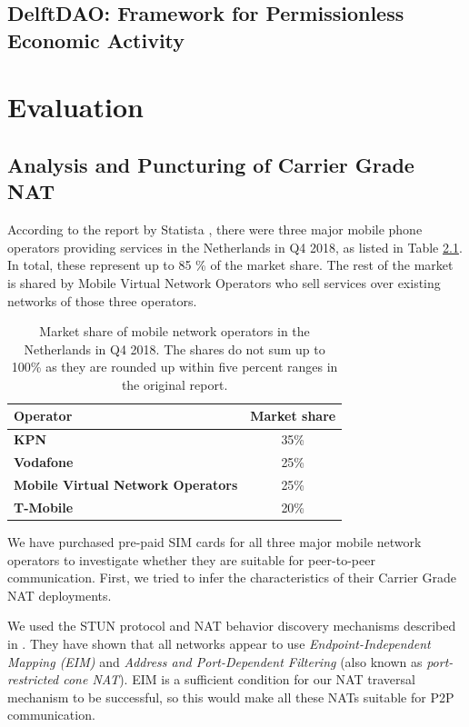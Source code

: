 \section{DelftDAO: Framework for Permissionless Economic Activity}

\chapter{Evaluation}

\section{Analysis and Puncturing of Carrier Grade NAT}

According to the report by Statista \cite{statista:marketshare}, there were three major mobile phone operators providing services in the Netherlands in Q4 2018, as listed in Table \ref{table_marketshare}. In total, these represent up to 85 \% of the market share. The rest of the market is shared by Mobile Virtual Network Operators who sell services over existing networks of those three operators.

\begin{table}
    \centering
    \begin{tabular}{ | l | c | }
        \hline
        \textbf{Operator} & \textbf{Market share} \\
        \hline
        \textbf{KPN} & 35\% \\
        \textbf{Vodafone} & 25\% \\
        \textbf{Mobile Virtual Network Operators} & 25\% \\
        \textbf{T-Mobile} & 20\% \\
        \hline
    \end{tabular}
    \caption{Market share of mobile network operators in the Netherlands in Q4 2018. The shares do not sum up to 100\% as they are rounded up within five percent ranges in the original report. \cite{statista:marketshare}}
    \label{table_marketshare}
\end{table}

We have purchased pre-paid SIM cards for all three major mobile network operators to investigate whether they are suitable for peer-to-peer communication. First, we tried to infer the characteristics of their Carrier Grade NAT deployments.

We used the STUN protocol and NAT behavior discovery mechanisms described in \cite{rfc5780}. They have shown that all networks appear to use \textit{Endpoint-Independent Mapping (EIM)} and \textit{Address and Port-Dependent Filtering} (also known as \textit{port-restricted cone NAT}). EIM is a sufficient condition for our NAT traversal mechanism to be successful, so this would make all these NATs suitable for P2P communication.

